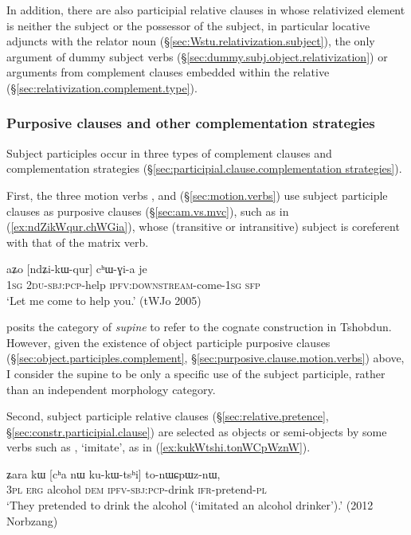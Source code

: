 In addition, there are also participial relative clauses in  whose relativized element is neither the subject or the possessor of the subject, in particular locative adjuncts with the relator noun  (§\ref{sec:Wstu.relativization.subject}), the only argument of dummy subject verbs (§\ref{sec:dummy.subj.object.relativization}) or arguments from complement clauses embedded within the relative (§\ref{sec:relativization.complement.type}).

  \subsubsection{Purposive clauses and other complementation strategies}  \label{sec:subject.participle.complementation}
Subject participles occur in three types of complement clauses and complementation strategies (§\ref{sec:participial.clause.complementation strategies}). 

First, the three motion verbs ,  and   (§\ref{sec:motion.verbs}) use subject participle clauses as purposive clauses (§\ref{sec:am.vs.mvc}), such as  in (\ref{ex:ndZikWqur.chWGia}), whose (transitive or intransitive) subject is coreferent with that of the matrix verb.

\begin{exe}
\ex \label{ex:ndZikWqur.chWGia}
\gll aʑo [ndʑi-kɯ-qur] cʰɯ-ɣi-a je \\
\textsc{1sg} \textsc{2du}-\textsc{sbj}:\textsc{pcp}-help \textsc{ipfv}:\textsc{downstream}-come-\textsc{1sg} \textsc{sfp} \\
\glt `Let me come to help you.' (tWJo 2005) 
\end{exe} 

\citet{sun12complementation} posits the category of \textit{supine} to refer to the cognate construction in Tshobdun. However, given the existence of object participle purposive clauses (§\ref{sec:object.participles.complement}, §\ref{sec:purposive.clause.motion.verbs}) above, I consider the supine to be only a specific use of the subject participle, rather than an independent morphology category.

Second,  subject participle relative clauses (§\ref{sec:relative.pretence}, §\ref{sec:constr.participial.clause}) are selected as objects or semi-objects by some verbs such as , `imitate', as in  (\ref{ex:kukWtshi.tonWCpWznW}).

\begin{exe}
\ex \label{ex:kukWtshi.tonWCpWznW}
 \gll  ʑara kɯ [cʰa nɯ ku-kɯ-tsʰi] to-nɯɕpɯz-nɯ, \\
\textsc{3pl} \textsc{erg} alcohol \textsc{dem} \textsc{ipfv}-\textsc{sbj}:\textsc{pcp}-drink \textsc{ifr}-pretend-\textsc{pl} \\
\glt  `They pretended to drink the alcohol (`imitated an alcohol drinker').'  (2012 Norbzang) 
\end{exe}

